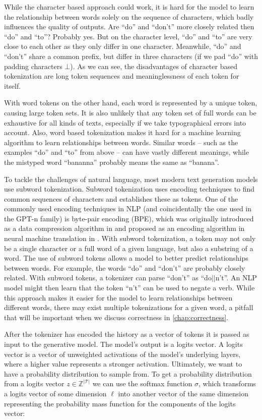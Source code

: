 While the character based approach could work, it is hard for the model to learn the relationship between words solely on the sequence of characters, which badly influences the quality of outputs.
Are ``do'' and ``don't'' more closely related then ``do'' and ``to''?
Probably yes.
But on the character level, ``do'' and ``to'' are very close to each other as they only differ in one character.
Meanwhile, ``do'' and ``don't'' share a common prefix, but differ in three characters (if we pad ``do'' with padding characters $\bot$).
As we can see, the disadvantages of character based tokenization are long token sequences and meaninglessness of each token for itself.

With word tokens on the other hand, each word is represented by a unique token, causing large token sets.
It is also unlikely that any token set of full words can be exhaustive for all kinds of texts, especially if we take typographical errors into account.
Also, word based tokenization makes it hard for a machine learning algorithm to learn relationships between words.
Similar words -- such as the examples ``do'' and ``to'' from above -- can have vastly different meanings, while the mistyped word ``bananna'' probably means the same as ``banana''.

To tackle the challenges of natural language, most modern text generation models use subword tokenization.
Subword tokenization uses encoding techniques to find common sequences of characters and establishes these as tokens.
One of the commonly used encoding techniques in NLP (and coincidentally the one used in the GPT-n family) is byte-pair encoding (BPE), which was originally introduced as a data compression algorithm in \cite{BPE1994} and proposed as an encoding algorithm in neural machine translation in \cite{BPENMT2016}.
With subword tokenization, a token may not only be a single character or a full word of a given language, but also a substring of a word.
The use of subword tokens allows a model to better predict relationships between words.
For example, the words ``do'' and ``don't'' are probably closely related.
With subword tokens, a tokenizer can parse ``don't'' as ``do$||$n't''. 
An NLP model might then learn that the token ``n't'' can be used to negate a verb.
While this approach makes it easier for the model to learn relationships between different words, there may exist multiple tokenizations for a given word, a pitfall that will be important when we discuss correctness in \autoref{chap:correctness}.

After the tokenizer has encoded the history as a vector of tokens it is passed as input to the generative model.
The model's output is a logits vector.
A logits vector is a vector of unweighted activations of the model's underlying layers, where a higher value represents a stronger activation.
Ultimately, we want to have a probability distribution to sample from.
To get a probability distribution from a logits vector $z \in \mathbb{Z}^{|\mathcal{T}|}$ we can use the softmax function $\sigma$, which transforms a logits vector of some dimension $\ell$ into another vector of the same dimension representing the probability mass function for the components of the logits vector:


